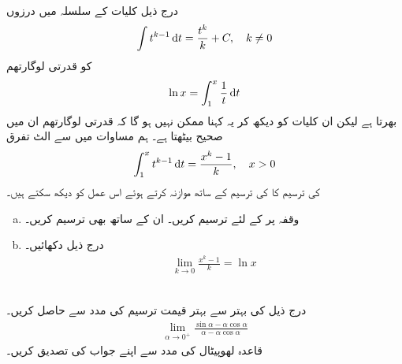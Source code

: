 \\
درج ذیل کلیات کے  سلسلہ میں  درزوں  
\begin{align}\label{مساوات_سوال_ماورائی_لوگارتھم}
\int t^{k-1}\dif t=\frac{t^k}{k}+C,\quad k\ne 0
\end{align}
کو قدرتی لوگارتھم
\begin{align*}
\ln x=\int_1^x\frac{1}{t}\dif t
\end{align*}
بھرتا ہے لیکن ان کلیات  کو دیکھ کر یہ کہنا ممکن نہیں ہو گا کہ قدرتی لوگارتھم ان میں صحیح بیٹھتا ہے۔ ہم مساوات  میں سے الٹ تفرق 
\begin{align*}
\int_1^xt^{k-1}\dif t=\frac{x^k-1}{k},\quad x>0
\end{align*}
کی ترسیم کا  کی ترسیم کے ساتھ موازنہ کرتے ہوئے اس عمل کو دیکھ سکتے ہیں۔
\begin{enumerate}[a.]
\item
وقفہ  پر  کے لئے   ترسیم کریں۔ ان کے ساتھ  بھی ترسیم کریں۔
\item
درج ذیل دکھائیں۔
\begin{align*}
\lim_{k\to 0}\frac{x^k-1}{k}=\ln x
\end{align*}
\end{enumerate}
\\
درج ذیل کی بہتر سے بہتر قیمت ترسیم کی مدد سے حاصل کریں۔
\begin{align*}
\lim_{\alpha\to 0^+}\frac{\sin\alpha-\alpha\cos\alpha}{\alpha-\alpha\cos\alpha}
\end{align*} 
قاعدہ لھوپیٹال کی مدد سے اپنے جواب کی تصدیق کریں۔
